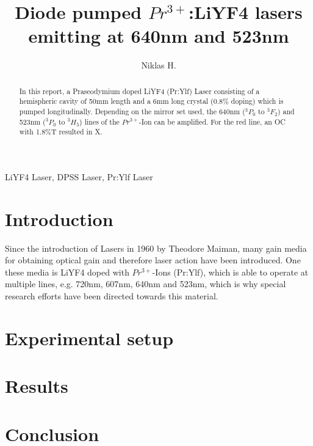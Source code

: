 \documentclass[conference]{IEEEtran}
\begin{document}
\title{Diode pumped $Pr^{3+}$:LiYF4 lasers emitting at 640nm and 523nm\\
}

\author{Niklas H.}

\maketitle

\begin{abstract}
In this report, a Praseodymium doped LiYF4 (Pr:Ylf) Laser consisting of a hemispheric cavity of 50mm length and a 6mm long crystal (0.8\% doping) which is pumped longitudinally. Depending on the mirror set used, the 640nm ($^3P_0$ to $^3F_2$) and 523nm ($^3P_0$ to $^3H_5$) lines of the $Pr^{3+}$-Ion can be amplified. For the red line, an OC with 1.8\%T resulted in X.
\end{abstract}

\begin{IEEEkeywords}
LiYF4 Laser, DPSS Laser, Pr:Ylf Laser
\end{IEEEkeywords}
\section{Introduction}

Since the introduction of Lasers in 1960 by Theodore Maiman, many gain media for obtaining optical gain and therefore laser action have been introduced. One these media is LiYF4 doped with $Pr^{3+}$-Ions (Pr:Ylf), which is able to operate at multiple lines, e.g. 720nm, 607nm, 640nm and 523nm, which is why special research efforts have been directed towards this material. 

\section{Experimental setup}
\section{Results}
\section{Conclusion}
\end{document}

